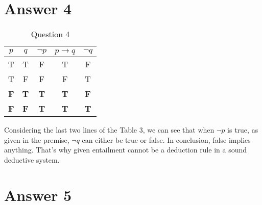 \documentclass[12pt]{article}
\begin{document}
\section*{Answer 4}

\begin{table}[H]
\small
\centering
\caption{Question 4}
\label{table:3}
\begin{tabular}{|cc|c|c|c|}
\hline
$p$ &
$q$ &
$\neg p$ &
$p \rightarrow q$ &
$\neg q$ \\
\hline
\hline
T&T&F&T&F \\
\hline
T&F&F&F&T \\
\hline
\textbf{F}&\textbf{T}& \textbf{T}&\textbf{T}&\textbf{F} \\
\hline
\textbf{F}&\textbf{F}&\textbf{T}&\textbf{T}&\textbf{T} \\
\hline
\end{tabular}
\end{table}

\hspace{1cm} Considering the last two lines of the Table 3, we can see that when $\neg p$ is true, as given in the premise, $\neg q$ can either be true or false. In conclusion, false implies anything. That's why given entailment cannot be a deduction rule in a sound deductive system.

\section*{Answer 5}
\end{document}
